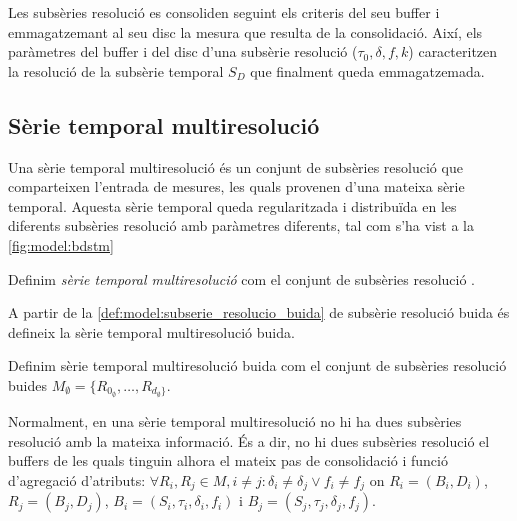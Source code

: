Les subsèries resolució es consoliden seguint els criteris del seu
buffer i emmagatzemant al seu disc la mesura que resulta de la
consolidació. Així, els paràmetres del buffer i del disc d'una
subsèrie resolució ($\tau_0, \delta, f, k$) caracteritzen la resolució
de la subsèrie temporal $S_D$ que finalment queda emmagatzemada.




\subsection{Sèrie temporal multiresolució}











Una sèrie temporal multiresolució és un conjunt de subsèries resolució
que comparteixen l'entrada de mesures, les quals provenen d'una
mateixa sèrie temporal. Aquesta sèrie temporal queda regularitzada i
distribuïda en les diferents subsèries resolució amb paràmetres
diferents, tal com s'ha vist a la \autoref{fig:model:bdstm}


\begin{definition}
  Definim \emph{sèrie temporal multiresolució} com el conjunt de subsèries
  resolució .
\end{definition}

A partir de la \autoref{def:model:subserie_resolucio_buida} de
subsèrie resolució buida és defineix la sèrie temporal multiresolució
buida.
 
\begin{definition}\label{def:model:st_multiresolucio_buit}
  Definim sèrie temporal multiresolució buida com el conjunt de subsèries
  resolució buides
  $M_{\emptyset}=\{R_{0_{\emptyset}},\dotsc,R_{d_{\emptyset}\}}$.
\end{definition}

Normalment, en una sèrie temporal multiresolució no hi ha dues
subsèries resolució amb la mateixa informació. És a dir, no hi dues
subsèries resolució el buffers de les quals tinguin alhora el mateix
pas de consolidació i funció d'agregació d'atributs: $\forall
R_i,R_j\in M, i\neq j : \delta_i \neq \delta_j \vee f_i \neq f_j$ on
$R_i = (B_i, D_i)$, $R_j = (B_j, D_j)$,
$B_i=(S_i,\tau_i,\delta_i,f_i)$ i $B_j=(S_j,\tau_j,\delta_j,f_j)$.


